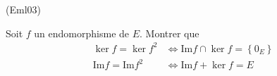 \begin{tiny}(Eml03)\end{tiny}
Soit $f$ un endomorphisme de $E$. Montrer que
\begin{align*}
\ker f=\ker f^{2} &\Leftrightarrow  \mathrm{Im}f\cap \ker f=\left\{0_{E}\right\} \\
\mathrm{Im}f=\mathrm{Im}f^{2} &\Leftrightarrow  \mathrm{Im}f+\ker f=E
\end{align*}
